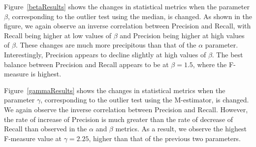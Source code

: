 \documentclass[conference]{IEEEtran}
\begin{document}
Figure~\ref{betaResults} shows the changes in statistical metrics when the parameter $\beta$, corresponding to the outlier test using the median, is changed. As shown in the figure, we again observe an inverse correlation between Precision and Recall, with Recall being higher at low values of $\beta$ and Precision being higher at high values of $\beta$. These changes are much more precipitous than that of the $\alpha$ parameter. Interestingly, Precision appears to decline slightly at high values of $\beta$. The best balance between Precision and Recall appears to be at $\beta = 1.5$, where the F-measure is highest.

Figure~\ref{gammaResults} shows the changes in statistical metrics when the parameter $\gamma$, corresponding to the outlier test using the M-estimator, is changed. We again observe the inverse correlation between Precision and Recall. However, the rate of increase of Precision is much greater than the rate of decrease of Recall than observed in the $\alpha$ and $\beta$ metrics. As a result, we observe the highest F-measure value at $\gamma = 2.25$, higher than that of the previous two parameters.
\end{document}
